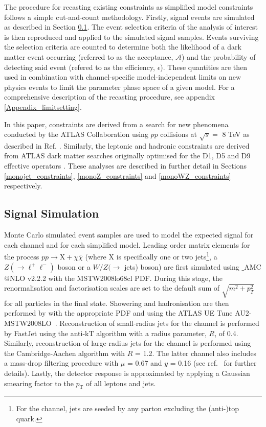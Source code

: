 The procedure for recasting existing \monoX constraints as simplified model constraints follows a simple cut-and-count methodology. Firstly, signal events are simulated as described in Section \ref{signal_generation}. The event selection criteria of the \monoX analysis of interest is then reproduced and applied to the simulated signal samples. Events surviving the selection criteria are counted to determine both the likelihood of a dark matter event occurring (referred to as the acceptance, $\mathcal{A}$) and the probability of detecting said event (refered to as the efficiency, $\epsilon$). These quantities are then used in combination with channel-specific model-independent limits on new physics events to limit the parameter phase space of a given model.
For a comprehensive description of the recasting procedure, see appendix \ref{Appendix_limitsetting}.

In this paper, \monojet constraints are derived from a search for new phenomena conducted by the ATLAS Collaboration using $pp$ collisions at $\sqrt{s}=$ 8 TeV as described in Ref. \cite{Aad:2015zva}. Similarly, the leptonic \monoZ and hadronic \monoWZ constraints are derived from ATLAS dark matter searches originally optimised for the D1, D5 and D9 effective operators \cite{Aad:2014monoZlep, ATLASmonoWZ}. These analyses are described in further detail in Sections \ref{monojet_constraints}, \ref{monoZ_constraints} and \ref{monoWZ_constraints} respectively.


\subsection{Signal Simulation}
\label{signal_generation}
Monte Carlo simulated event samples are used to model the expected signal for each channel and for each simplified model. Leading order matrix elements for the process $pp \rightarrow \mathrm{X} + \chi\bar{\chi}$ (where X is specifically one or two jets\footnote{For the \monojet channel, jets are seeded by any parton excluding the (anti-)top quark.}, a $Z(\rightarrow \ell^+ \ell^-)$ boson or a $W/Z(\rightarrow$ jets) boson) are first simulated using \MG$\_${\footnotesize A}MC$@$NLO v2.2.2 \cite{MG_aMCNLO2014} with the MSTW2008lo68cl PDF\cite{MSTW}. During this stage, the renormalisation and factorisation scales are set to the default sum of $\sqrt{m^{2} + p_{T}^{2}}$ for all particles in the final state. Showering and hadronisation are then performed by  with the appropriate PDF and using the ATLAS UE Tune AU2-MSTW2008LO~\cite{AUtune}. Reconstruction of small-radius jets for the \monojet channel is performed by FastJet \cite{} using the anti-kT algorithm with a radius parameter, $R$, of 0.4. Similarly, reconstruction of large-radius jets for the \monoWZ channel is performed using the Cambridge-Aachen algorithm with $R$ = 1.2. The latter channel also includes a mass-drop filtering procedure with $\mu$ = 0.67 and $y$ = 0.16 (see ref.~\cite{} for further details). Lastly, the detector response is approximated by applying a Gaussian smearing factor to the $p_{\mathrm{T}}$ of all leptons and jets. 

